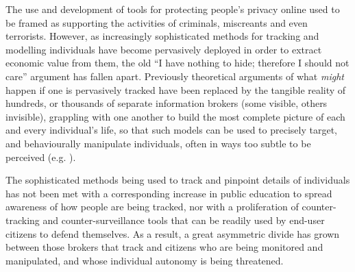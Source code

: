 \documentclass{IOS-Book-Article}     %
\begin{document}
The use and development of tools for protecting people's privacy online used to
be framed as supporting the activities of criminals, miscreants and even terrorists.  
However, as increasingly sophisticated methods for tracking and modelling individuals
have become pervasively deployed in order to extract economic value from them, 
the old ``I have nothing to hide; therefore I should not care'' argument has fallen apart. 
Previously theoretical arguments of what \emph{might} happen if one is pervasively tracked have been replaced by the tangible reality of hundreds, or thousands of separate information brokers 
(some visible, others invisible), grappling with one another to build the most 
complete picture of each and every individual's life, so that such models 
can be used to precisely target, and behaviourally manipulate individuals,
often in ways too subtle to be perceived (e.g. \cite{Kramer17062014}). 

The sophisticated methods being used to track and pinpoint details of individuals 
has not been met with a corresponding increase in public education to spread awareness
of how people are being tracked, nor with a proliferation of counter-tracking and 
counter-surveillance tools that can be readily used by end-user citizens to defend 
themselves.  As a result, a great asymmetric divide has grown between 
those brokers that track and citizens who are being monitored and manipulated, 
and whose individual autonomy is being threatened.  

% 


\end{document}
